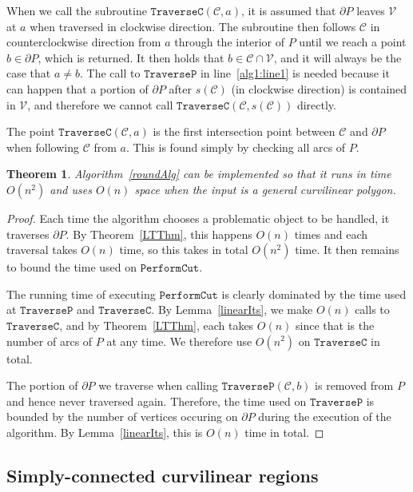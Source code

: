 \documentclass{article}
\newcommand{\ttt}[1]{\texttt{#1}}
\newcommand{\PP}{P}
\newcommand{\VV}{\mathcal V}
\newcommand{\cut}{\mathcal C}
\newcommand{\start}{s}
\newtheorem{theorem}{Theorem}[section]
\begin{document}
When we call the subroutine $\ttt{TraverseC}(\cut,a)$, it is assumed that $\partial\PP$ leaves $\VV$ at $a$ when traversed in clockwise direction.
The subroutine then follows $\cut$ in counterclockwise direction from $a$ through the interior of $\PP$ until we reach a point $b\in\partial\PP$, which is returned.
It then holds that $b\in\cut\cap\VV$, and it will always be the case that $a\neq b$.
The call to $\ttt{TraverseP}$ in line~\ref{alg1:line1} is needed because it can happen that a portion of $\partial P$ after $\start(\cut)$ (in clockwise direction) is contained in $\VV$, and therefore we cannot call $\ttt{TraverseC}(\cut,\start(\cut))$ directly.

The point $\ttt{TraverseC}(\cut,a)$ is the first intersection point between $\cut$ and $\partial\PP$ when following $\cut$ from
$a$.
This is found simply by checking all arcs of $\PP$.

\begin{theorem}\label{finalThmGen}
Algorithm~\ref{roundAlg} can be implemented so that it runs in time $O(n^2)$ and uses $O(n)$ space when the input is a general curvilinear polygon.
\end{theorem}

\begin{proof}
Each time the algorithm chooses a problematic object to be handled, it traverses $\partial\PP$.
By Theorem~\ref{LTThm}, this happens $O(n)$ times and each traversal takes $O(n)$ time, so this takes in total $O(n^2)$ time.
It then remains to bound the time used on $\ttt{PerformCut}$.

The running time of executing $\ttt{PerformCut}$ is clearly dominated by the time used at $\ttt{TraverseP}$ and $\ttt{TraverseC}$.
By Lemma~\ref{linearIts}, we make $O(n)$ calls to $\ttt{TraverseC}$, and by Theorem~\ref{LTThm}, each takes $O(n)$ since that is the number of arcs of $\PP$ at any time.
We therefore use $O(n^2)$ on $\ttt{TraverseC}$ in total.

The portion of $\partial\PP$ we traverse when calling
$\ttt{TraverseP}(\cut,b)$ is removed from $\PP$ and hence never traversed again.
Therefore, the time used on $\ttt{TraverseP}$ is bounded by the number of
vertices occuring on $\partial\PP$ during the execution of the algorithm.
By Lemma~\ref{linearIts}, this is $O(n)$ time in total.
\end{proof}

\subsection{Simply-connected curvilinear regions}\label{anImplementation:simply}
\end{document}
